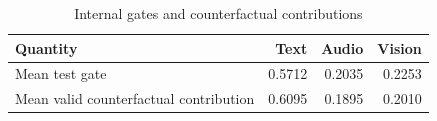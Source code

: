 \begin{table}[htbp]
\centering
\caption{Internal gates and counterfactual contributions}
\label{tab:q3_modality_fusion}
\begin{tabular}{lrrr}
\toprule
Quantity & Text & Audio & Vision \\
\midrule
Mean test gate & 0.5712 & 0.2035 & 0.2253 \\
Mean valid counterfactual contribution & 0.6095 & 0.1895 & 0.2010 \\
\bottomrule
\end{tabular}
\end{table}
